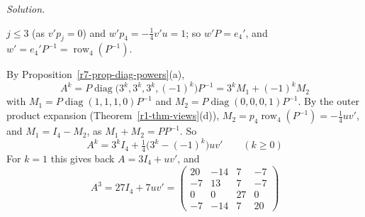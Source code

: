 \documentclass[12pt]{article}
\DeclareMathOperator{\row}{row}
\DeclareMathOperator{\diag}{diag}
\theoremstyle{definition}
\newenvironment{solution}{\par\noindent\textit{Solution.}\ }{\par\smallskip}
\begin{document}
\begin{solution}
\begin{itemize}
\(j\leqslant3\) (as \(v'p_j=0\)) and \(w'p_4=-\frac14v'u=1\); so \(w'P=e_4'\), and \(w'=e_4'P^{-1}=\row_4(P^{-1})\).
\end{itemize}
By Proposition~\ref{r7-prop-diag-powers}(a),
\[
A^k=P\diag\bigl(3^k,3^k,3^k,(-1)^k\bigr)P^{-1}=3^kM_1+(-1)^kM_2
\]
with \(M_1=P\diag(1,1,1,0)P^{-1}\) and \(M_2=P\diag(0,0,0,1)P^{-1}\). By the outer product expansion
(Theorem~\ref{r1-thm-views}(d)), \(M_2=p_4\row_4(P^{-1})=-\frac14uv'\), and \(M_1=I_4-M_2\), as \(M_1+M_2=PP^{-1}\). So
\[
A^k=3^kI_4+\tfrac14\bigl(3^k-(-1)^k\bigr)uv'\qquad(k\geqslant0)
\]
For \(k=1\) this gives back \(A=3I_4+uv'\), and
\[
A^3=27I_4+7uv'=\begin{pmatrix}20&-14&7&-7\\-7&13&7&-7\\0&0&27&0\\-7&-14&7&20\end{pmatrix}
\]
\end{solution}
\end{document}
